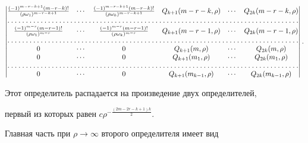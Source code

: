 \begin{equation} 


\begin{vmatrix} 


\frac{(-1)^{m-r-k+1}(m-r-k)!}{(\rho\omega_1)^{m-r-k+1}} & \dotsb &


\frac{(-1)^{m-r-k+1}(m-r-k)!}{(\rho\omega_k)^{m-r-k+1}} & 


Q_{k+1}(m-r-k,\rho) & \dotsb & Q_{2k}(m-r-k,\rho) \\ 


\hdotsfor[1.5]{6} \\


\frac{(-1)^{m-r}(m-r-1)!}{(\rho\omega_1)^{m-r}} & \dotsb & 


\frac{(-1)^{m-r}(m-r-1)!}{(\rho\omega_k)^{m-r}} & 


Q_{k+1}(m-r-1,\rho) & \dotsb & Q_{2k}(m-r-1,\rho) \\ 


\hdotsfor[1.5]{6} \\


0 & \dotsb & 0 & Q_{k+1}(m,\rho) & \dotsb & Q_{2k}(m,\rho) \\ 


0 & \dotsb & 0 & Q_{k+1}(m_1,\rho) & \dotsb & Q_{2k}(m_1,\rho) \\ 


\hdotsfor[1.5]{6} \\


0 & \dotsb & 0 & Q_{k+1}(m_{k-1},\rho) & \dotsb & Q_{2k}(m_{k-1},\rho) 


\end{vmatrix} 


. 


\end{equation} 


Этот определитель распадается на произведение двух определителей,  


первый из которых равен $c\rho^{-\frac{(2m-2r-k+1)k}{2}}$. 


Главная часть при $\rho\to\infty$ второго определителя имеет вид 


$$ 


